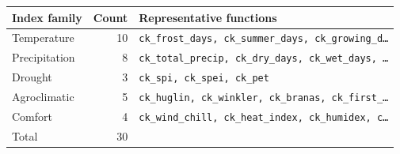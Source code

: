 \begin{tabular}{lrl}
\toprule
Index family & Count & Representative functions \\
\midrule
Temperature & 10 & \texttt{ck\_frost\_days, ck\_summer\_days, ck\_growing\_d\ldots} \\
Precipitation & 8 & \texttt{ck\_total\_precip, ck\_dry\_days, ck\_wet\_days, \ldots} \\
Drought & 3 & \texttt{ck\_spi, ck\_spei, ck\_pet} \\
Agroclimatic & 5 & \texttt{ck\_huglin, ck\_winkler, ck\_branas, ck\_first\_\ldots} \\
Comfort & 4 & \texttt{ck\_wind\_chill, ck\_heat\_index, ck\_humidex, c\ldots} \\
\midrule
Total & 30 & \\
\bottomrule
\end{tabular}
